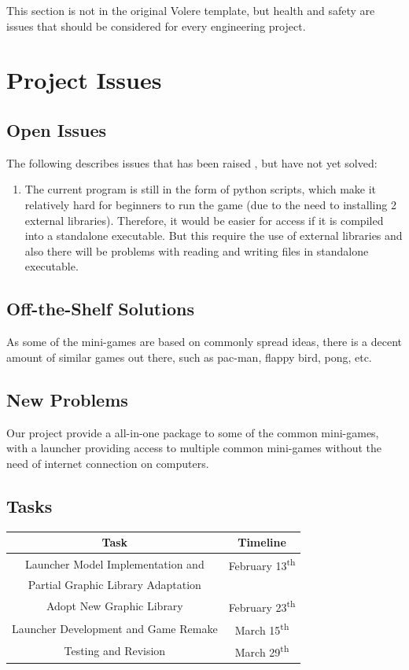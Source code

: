 \documentclass[12pt, titlepage]{article}
\begin{document}
This section is not in the original Volere template, but health and safety are
issues that should be considered for every engineering project.

\section{Project Issues}

\subsection{Open Issues}

The following describes issues that has been raised , but have not yet solved:
\begin{enumerate}
    \item The current program is still in the form of python scripts, which make it relatively hard for beginners to run the game (due to the need to installing 2 external libraries). Therefore, it would be easier for access if it is compiled into a standalone executable. But this require the use of external libraries and also there will be problems with reading and writing files in standalone executable.
\end{enumerate}

\subsection{Off-the-Shelf Solutions}

As some of the mini-games are based on commonly spread ideas, there is a decent amount of similar games out there, such as pac-man, flappy bird, pong, etc.

\subsection{New Problems}

Our project provide a all-in-one package to some of the common mini-games, with a launcher providing access to multiple common mini-games without the need of internet connection on computers.

\subsection{Tasks}

\begin{center}
\begin{tabular}{ |c|c| } 
\hline
\textbf{Task} & \textbf{Timeline}\\
\hline
Launcher Model Implementation and  & February 13\textsuperscript{th}\\
Partial Graphic Library Adaptation &\\
\hline
Adopt New Graphic Library & February 23\textsuperscript{th}\\
\hline
Launcher Development and Game Remake & March 15\textsuperscript{th}\\
\hline
Testing and Revision & March 29\textsuperscript{th}\\
\hline
\end{tabular}
\end{center}
\end{document}
